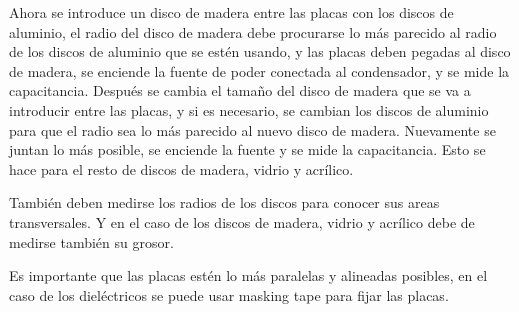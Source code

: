 \documentclass[article,12pt]{elsarticle}
\begin{document}
    Ahora se introduce un disco de madera entre las placas con los discos de aluminio, el radio del disco de madera debe procurarse lo más parecido al radio de los discos de aluminio que se estén usando, y las placas deben pegadas al disco de madera, se enciende la fuente de poder conectada al condensador, y se mide la capacitancia.
    Después se cambia el tamaño del disco de madera que se va a introducir entre las placas, y si es necesario, se cambian los discos de aluminio para que el radio sea lo más parecido al nuevo disco de madera. Nuevamente se juntan lo más posible, se enciende la fuente y se mide la capacitancia.
    Esto se hace para el resto de discos de madera, vidrio y acrílico.

    También deben medirse los radios de los discos para conocer sus areas transversales. Y en el caso de los discos de madera, vidrio y acrílico debe de medirse también su grosor.
    
    Es importante que las placas estén lo más paralelas y alineadas posibles, en el caso de los dieléctricos se puede usar masking tape para fijar las placas.
\end{document}

